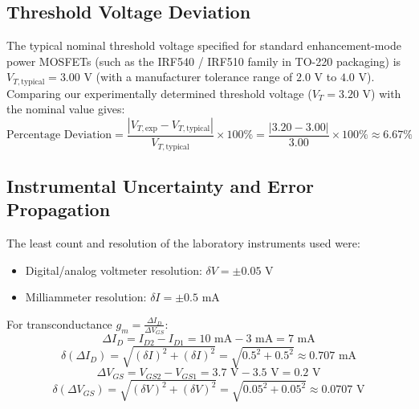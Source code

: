 \documentclass[12pt,a4paper]{article}
\begin{document}
\subsection{Threshold Voltage Deviation}
The typical nominal threshold voltage specified for standard enhancement-mode power MOSFETs (such as the IRF540 / IRF510 family in TO-220 packaging) is $V_{T,\text{typical}} = 3.00\text{ V}$ (with a manufacturer tolerance range of $2.0\text{ V}$ to $4.0\text{ V}$).
Comparing our experimentally determined threshold voltage ($V_T = 3.20\text{ V}$) with the nominal value gives:
\begin{equation}
    \text{Percentage Deviation} = \frac{|V_{T,\text{exp}} - V_{T,\text{typical}}|}{V_{T,\text{typical}}} \times 100\% = \frac{|3.20 - 3.00|}{3.00} \times 100\% \approx 6.67\%
\end{equation}

\subsection{Instrumental Uncertainty and Error Propagation}
The least count and resolution of the laboratory instruments used were:
\begin{itemize}
    \item Digital/analog voltmeter resolution: $\delta V = \pm 0.05\text{ V}$
    \item Milliammeter resolution: $\delta I = \pm 0.5\text{ mA}$
\end{itemize}

For transconductance $g_m = \frac{\Delta I_D}{\Delta V_{GS}}$:
\begin{equation}
    \Delta I_D = I_{D2} - I_{D1} = 10\text{ mA} - 3\text{ mA} = 7\text{ mA}
\end{equation}
\begin{equation}
    \delta(\Delta I_D) = \sqrt{(\delta I)^2 + (\delta I)^2} = \sqrt{0.5^2 + 0.5^2} \approx 0.707\text{ mA}
\end{equation}
\begin{equation}
    \Delta V_{GS} = V_{GS2} - V_{GS1} = 3.7\text{ V} - 3.5\text{ V} = 0.2\text{ V}
\end{equation}
\begin{equation}
    \delta(\Delta V_{GS}) = \sqrt{(\delta V)^2 + (\delta V)^2} = \sqrt{0.05^2 + 0.05^2} \approx 0.0707\text{ V}
\end{equation}
\end{document}
